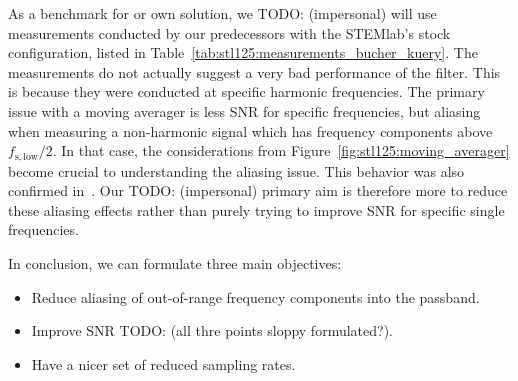 As  a benchmark  for  or  own solution,  we TODO: (impersonal)  will  use measurements  conducted
by  our  predecessors  with  the  STEMlab's  stock  configuration,  listed  in
Table~\ref{tab:stl125:measurements_bucher_kuery}. The   measurements  do   not
actually  suggest  a very  bad  performance  of  the filter. This  is  because
they   were   conducted   at  specific   harmonic   frequencies. The   primary
issue  with  a   moving  averager  is  less  SNR   for  specific  frequencies,
but  aliasing  when  measuring  a  non-harmonic  signal  which  has  frequency
components above  $f_\mathrm{s,low}/2$. In that case, the  considerations from
Figure~\ref{fig:stl125:moving_averager}  become crucial  to understanding  the
aliasing issue.  This behavior was also confirmed in~\cite{bucher:kuery}.  Our TODO: (impersonal)
primary aim  is therefore more  to reduce  these aliasing effects  rather than
purely trying to improve SNR for specific single frequencies.

\begin{table}
    \centering
    \caption{%
        Measurement results  for STEMlab  125-14 from~\cite{bucher:kuery}. SNR
        was  determined for  a  specific harmonic  frequency  signal for  each
        sampling rate.%
    }
    \label{tab:stl125:measurements_bucher_kuery}
\end{table}

In conclusion, we can formulate three main objectives:
\begin{itemize}
    \item
        Reduce  aliasing   of  out-of-range  frequency  components   into  the
        passband.
    \item
        Improve SNR TODO: (all thre points sloppy formulated?).
    \item
        Have a nicer set of reduced sampling rates.
\end{itemize}

